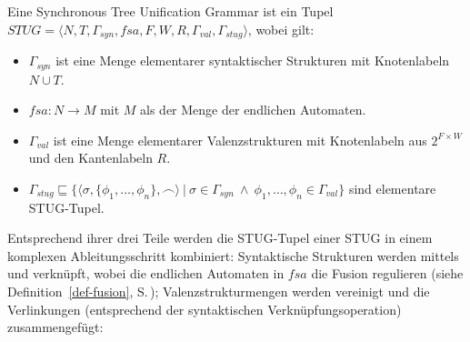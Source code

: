 \begin{definition} Eine Synchronous Tree Unification Grammar ist ein Tupel
$STUG = \langle N,T, \Gamma_{\!\mathit{syn}}, \mathit{fsa} ,F ,W ,R ,\Gamma_{\!\mathit{val}}, \Gamma_{\!\mathit{stug}} \rangle$, wobei gilt:
\begin{itemize}
  \item $\Gamma_{\!\mathit{syn}}$ ist eine Menge elementarer syntaktischer Strukturen mit Knotenlabeln\linebreak $N \cup T$.
  \item $\mathit{fsa}: N \to M$ mit $M$ als der Menge der endlichen Automaten.
  \item $\Gamma_{\!\mathit{val}}$ ist eine Menge elementarer Valenzstrukturen mit Knotenlabeln aus $2^{F \times W}$ und den Kantenlabeln $R$.
  \item $\Gamma_{\!\mathit{stug}} \sqsubseteq \{\langle \sigma,\{\phi_1,\ldots,\phi_n\}, \frown\rangle \ | \ \sigma \in \Gamma_{\!\mathit{syn}} \ \wedge \ \phi_1,\ldots,\phi_n \in \Gamma_{\!\mathit{val}}\}$ sind elementare STUG-Tupel.  
\end{itemize}
\end{definition}
Entsprechend ihrer drei Teile werden die STUG-Tupel einer STUG in einem komplexen Ableitungsschritt kombiniert: Syntaktische Strukturen werden mittels  und  verknüpft, wobei die endlichen Automaten in $\mathit{fsa}$ die Fusion regulieren (siehe Definition~\ref{def-fusion}, S.\,\pageref{def-fusion}); Valenzstrukturmengen werden vereinigt und die Verlinkungen (entsprechend der syntaktischen Verknüpfungsoperation) zusammengefügt:

